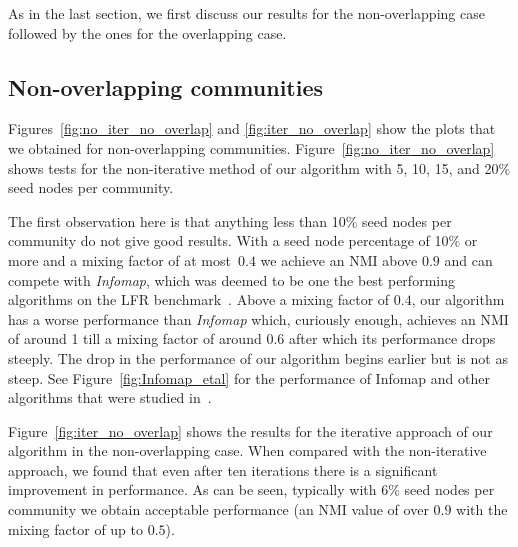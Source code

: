 \newcommand{\plotwidth}{0.8\linewidth}
\newcommand{\cfinderwidth}{0.96\linewidth}
\newcommand{\otherplotswidth}{0.76\linewidth}

As in the last section, we first discuss our results for the non-overlapping case followed by 
the ones for the overlapping case.

\subsection{Non-overlapping communities}
Figures~\ref{fig:no_iter_no_overlap} and \ref{fig:iter_no_overlap} %
show the plots that we obtained for non-overlapping communities. Figure~\ref{fig:no_iter_no_overlap}
shows tests for the non-iterative method of our algorithm with 5, 10, 15, and 20$\%$ seed nodes per 
community. 

The first observation here is that anything less than 10$\%$ seed nodes per community 
do not give good results. With a seed node percentage of 10$\%$ or more and 
a mixing factor of at most~$0.4$ we achieve an NMI above $0.9$ and can compete with \textit{Infomap}, 
which was deemed to be one the best performing algorithms on the LFR benchmark~\cite{LF09}. 
Above a mixing factor of $0.4$, our algorithm has a worse performance than \textit{Infomap} 
which, curiously enough, achieves an NMI of around 1 till a mixing factor of around 
$0.6$ after which its performance drops steeply. The drop in the performance of our algorithm 
begins earlier but is not as steep. See Figure~\ref{fig:Infomap_etal} for the performance 
of Infomap and other algorithms that were studied in~\cite{LF09}. 

Figure~\ref{fig:iter_no_overlap} shows the results for the iterative approach of 
our algorithm in the non-overlapping case. When compared with the non-iterative approach, 
we found that even after ten iterations there is a significant improvement in 
performance. %
As can be seen, typically with 6$\%$ seed nodes per community we obtain 
acceptable performance (an NMI value of over $0.9$ with the mixing factor 
of up to $0.5$).  


